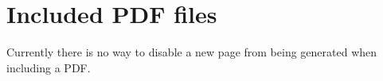 \chapter{Included PDF files}
Currently there is no way to disable a new page from being generated when including a PDF.


    
